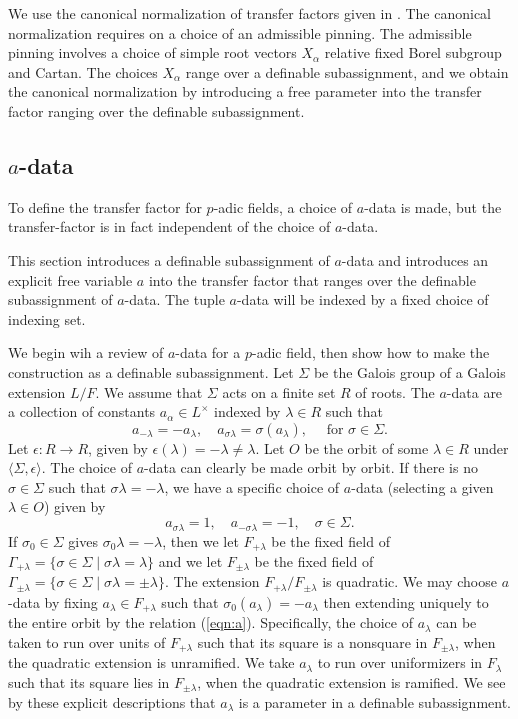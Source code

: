 We use the canonical normalization of transfer factors given in \cite[\S7]{hales1993simple}.  The canonical normalization requires
on a choice of an admissible pinning.  The admissible pinning involves a choice of simple root vectors $X_\alpha$ relative fixed Borel subgroup and Cartan.
The choices $X_\alpha$ range over a definable subassignment, and we obtain the canonical normalization by introducing a free
parameter into the transfer factor ranging over the definable subassignment.

\subsection{$a$-data}

To define the transfer factor for $p$-adic  fields, a choice of $a$-data is made, but the transfer-factor is in fact independent of the choice of $a$-data.

This section introduces a definable subassignment of $a$-data and introduces an explicit free variable $a$ into the transfer factor that ranges over
the definable subassignment of $a$-data.  The tuple $a$-data will be indexed by a fixed choice of indexing set.  

We begin wih a review of $a$-data for a $p$-adic field, then show how to make the construction as a definable subassignment.
Let $\Sigma$ be the Galois group of a Galois extension $L/F$.  We assume that $\Sigma$ acts on a finite set $R$ of roots.
The $a$-data are a collection of constants $a_\alpha\in L^\times$ indexed by $\lambda\in R$ such that
\begin{equation}\label{eqn:a}
a_{-\lambda} = -a_\lambda,\quad a_{\sigma\lambda} = \sigma(a_\lambda),\quad \text{ for } \sigma\in \Sigma.
\end{equation}
Let $\epsilon:R\to R$, given by $\epsilon(\lambda)=-\lambda\ne\lambda$.  Let $O$ be the orbit of some $\lambda\in R$ under $\langle \Sigma,\epsilon\rangle$.
The choice of $a$-data can clearly be made orbit by orbit.
If there is no $\sigma\in \Sigma$ such that $\sigma\lambda=-\lambda$, we have a specific choice of $a$-data (selecting a given $\lambda\in O$) given by
\[
a_{\sigma\lambda}=1,\quad a_{-\sigma\lambda}=-1,\quad \sigma\in\Sigma.
\]
If $\sigma_0\in\Sigma$ gives $\sigma_0\lambda=-\lambda$,  then we let $F_{+\lambda}$ be the fixed field of $\Gamma_{+\lambda} = \{\sigma\in\Sigma\mid \sigma\lambda=\lambda\}$
and we let
$F_{\pm\lambda}$ be the fixed field of $\Gamma_{\pm\lambda} = \{\sigma\in\Sigma\mid \sigma\lambda=\pm\lambda\}$.
The extension $F_{+\lambda}/F_{\pm\lambda}$ is quadratic.
We may choose $a$-data by fixing $a_\lambda\in F_{+\lambda}$ such that $\sigma_0(a_\lambda) = -a_\lambda$ then extending uniquely to the entire orbit  by the relation (\ref{eqn:a}).
Specifically, the choice of $a_\lambda$ can be taken to run over units of $F_{+\lambda}$ such that its square is a nonsquare in $F_{\pm\lambda}$, when the quadratic extension is unramified.
We take $a_\lambda$ to run over uniformizers in $F_{\lambda}$ such that its square lies in $F_{\pm\lambda}$, when the quadratic extension is ramified.
We see by these explicit descriptions that $a_\lambda$ is a parameter in a definable subassignment.


